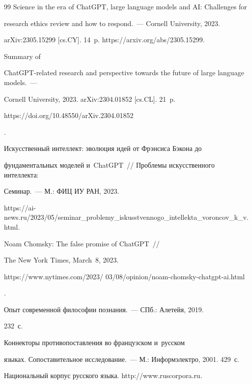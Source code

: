 {{\begin{thebibliography}{99}
 Science in the era of ChatGPT, large language models and AI: Challenges for 


research ethics review and how to respond.~--- Cornell University, 2023. 


arXiv:2305.15299 [cs.CY]. 14~p. {\sf https://arxiv.org/abs/2305.15299}.




 Summary of  


ChatGPT-related research and perspective towards the future of large language models.~--- 


Cornell University, 2023. arXiv:2304.01852 [cs.CL]. 21~p. {\sf 


https://doi.org/10.48550/arXiv.2304.01852}.




 Искусственный интеллект: эволюция идей от Фрэнсиса Бэкона до 


фундаментальных моделей и~\mbox{ChatGPT}~/\!\!/ Проб\-ле\-мы искусственного интеллекта: 


Семинар.~--- М.: ФИЦ ИУ РАН, 2023.


{\sf https://ai-news.ru/2023/05/seminar\_\linebreak problemy\_iskusstvennogo\_intellekta\_voroncov\_k\_v.html}.




 Noam Chomsky: The false promise of ChatGPT~/\!\!/ 


The New York Times, March~8, 2023. {\sf  


https://www.nytimes.com/2023/ 03/08/opinion/noam-chomsky-chatgpt-ai.html}.




 Опыт современной философии познания.~--- СПб.: Алетейя, 2019. 


232~с.




 Коннекторы про\-ти\-во\-по\-став\-ле\-ния во французском и~русском 


языках. Со\-по\-ста\-ви\-тель\-ное исследование.~--- М.: Ин\-форм\-элект\-ро, 2001. 429~с.




Национальный корпус русского языка. {\sf http://www.ruscorpora.ru}.






\end{thebibliography}}}
